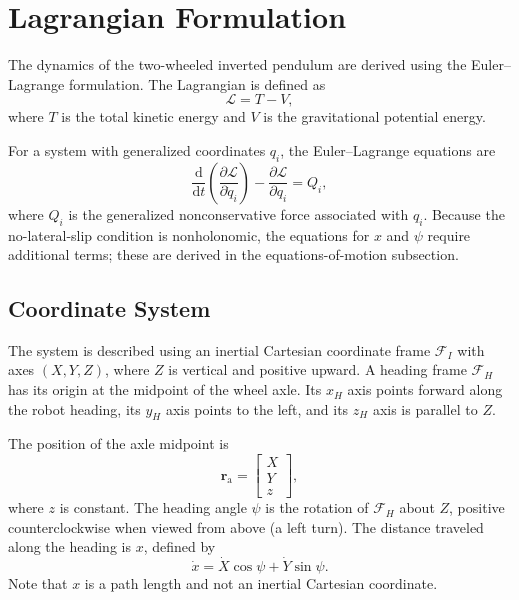 \documentclass[journal]{IEEEtran}
\begin{document}
\section{Lagrangian Formulation}

The dynamics of the two-wheeled inverted pendulum are derived using the
Euler--Lagrange formulation. The Lagrangian is defined as
\begin{equation}
    \mathcal{L} = T - V,
    \label{eq:lagrangian}
\end{equation}
where $T$ is the total kinetic energy and $V$ is the gravitational
potential energy.

For a system with generalized coordinates $q_i$, the
Euler--Lagrange equations are
\begin{equation}
    \frac{\mathrm{d}}{\mathrm{d}t}
    \left(
        \frac{\partial \mathcal{L}}
        {\partial \dot{q}_i}
    \right)
    -
    \frac{\partial \mathcal{L}}
    {\partial q_i}
    =
    Q_i,
    \label{eq:euler_lagrange}
\end{equation}
where $Q_i$ is the generalized nonconservative force associated with
$q_i$. Because the no-lateral-slip condition is nonholonomic, the
equations for $x$ and $\psi$ require additional terms; these are derived
in the equations-of-motion subsection.

\subsection{Coordinate System}

The system is described using an inertial Cartesian coordinate frame
$\mathcal{F}_I$ with axes $(X,Y,Z)$, where $Z$ is vertical and positive
upward. A heading frame $\mathcal{F}_H$ has its origin at the midpoint of
the wheel axle. Its $x_H$ axis points forward along the robot heading, its
$y_H$ axis points to the left, and its $z_H$ axis is parallel to $Z$.

The position of the axle midpoint is
\begin{equation}
    \bm{r}_{\mathrm{a}}
    =
    \begin{bmatrix}
        X \\
        Y \\
        z
    \end{bmatrix},
    \label{eq:axle_position}
\end{equation}
where $z$ is constant. The heading angle $\psi$ is the rotation of
$\mathcal{F}_H$ about $Z$, positive counterclockwise when viewed from above
(a left turn). The distance traveled along the heading is $x$, defined by
\begin{equation}
    \dot{x} = \dot{X}\cos\psi + \dot{Y}\sin\psi .
    \label{eq:x_definition}
\end{equation}
Note that $x$ is a path length and not an inertial Cartesian coordinate.
\end{document}
